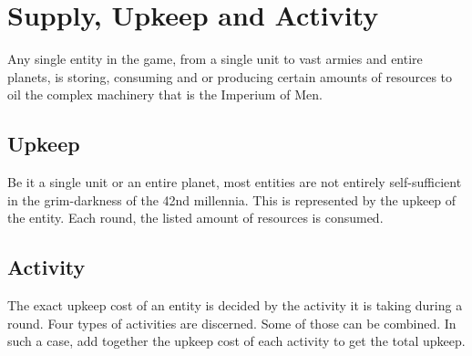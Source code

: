 \section{Supply, Upkeep and Activity}
Any single entity in the game, from a single unit to vast armies and entire planets, is storing, consuming and or producing certain amounts of resources to oil the complex machinery that is the Imperium of Men.

\subsection{Upkeep}
Be it a single unit or an entire planet, most entities are not entirely self-sufficient in the grim-darkness of the 42nd millennia. This is represented by the upkeep of the entity. Each round, the listed amount of resources is consumed.


\subsection{Activity}
The exact upkeep cost of an entity is decided by the activity it is taking during a round. Four types of activities are discerned. Some of those can be combined. In such a case, add together the upkeep cost of each activity to get the total upkeep.

